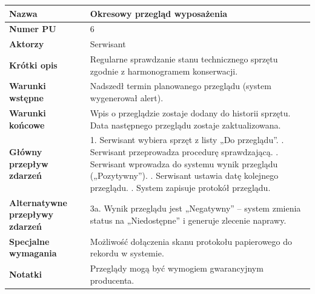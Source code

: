 \documentclass{article}
\begin{document}
    \begin{tabular}{|m{10em}|m{30em}|}
        \hline
        \textbf{Nazwa} & Okresowy przegląd wyposażenia \\
        \hline
        \textbf{Numer PU} & 6 \\
        \hline
        \textbf{Aktorzy} & Serwisant \\
        \hline
        \textbf{Krótki opis} & Regularne sprawdzanie stanu technicznego sprzętu zgodnie z harmonogramem konserwacji. \\
        \hline
        \textbf{Warunki wstępne} & Nadszedł termin planowanego przeglądu (system wygenerował alert). \\
        \hline
        \textbf{Warunki końcowe} & Wpis o przeglądzie zostaje dodany do historii sprzętu. Data następnego przeglądu zostaje zaktualizowana. \\
        \hline
        \textbf{Główny przepływ zdarzeń} & 
            1. Serwisant wybiera sprzęt z listy „Do przeglądu”. \newline
            2. Serwisant przeprowadza procedurę sprawdzającą. \newline
            3. Serwisant wprowadza do systemu wynik przeglądu („Pozytywny”). \newline
            4. Serwisant ustawia datę kolejnego przeglądu. \newline
            5. System zapisuje protokół przeglądu. \\
        \hline
        \textbf{Alternatywne przepływy zdarzeń} & 
            3a. Wynik przeglądu jest „Negatywny” – system zmienia status na „Niedostępne” i generuje zlecenie naprawy. \\
        \hline
        \textbf{Specjalne wymagania} & Możliwość dołączenia skanu protokołu papierowego do rekordu w systemie. \\
        \hline
        \textbf{Notatki} & Przeglądy mogą być wymogiem gwarancyjnym producenta. \\
        \hline
    \end{tabular}

    \vspace{1cm}
\end{document}
